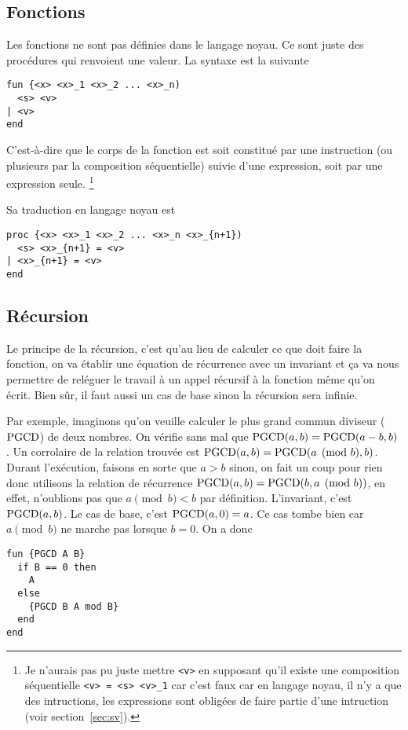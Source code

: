 \subsection{Fonctions}
Les fonctions ne sont pas définies dans le langage noyau.
Ce sont juste des procédures qui renvoient une valeur.
La syntaxe est la suivante
\begin{lstlisting}
fun {<x> <x>_1 <x>_2 ... <x>_n)
  <s> <v>
| <v>
end
\end{lstlisting}
C'est-à-dire que le corps de la fonction est soit constitué par une
instruction (ou plusieurs par la composition séquentielle)
suivie d'une expression, soit par une expression seule.
\footnote{Je n'aurais pas pu juste mettre \lstinline|<v>| en supposant
qu'il existe une composition
séquentielle \lstinline|<v> = <s> <v>_1| car c'est faux car en langage
noyau, il n'y a que des intructions, les expressions sont obligées de faire
partie d'une intruction (voir section~\ref{sec:sv}).}

Sa traduction en langage noyau est
\begin{lstlisting}
proc {<x> <x>_1 <x>_2 ... <x>_n <x>_{n+1})
  <s> <x>_{n+1} = <v>
| <x>_{n+1} = <v>
end
\end{lstlisting}

\subsection{Récursion}
\label{sec:rec}
Le principe de la récursion,
c'est qu'au lieu de calculer ce que doit faire la fonction,
on va établir une équation de récurrence avec un invariant et ça
va nous permettre de reléguer le travail à un appel récursif à la fonction
même qu'on écrit.
Bien sûr, il faut aussi un cas de base sinon la récursion sera
infinie.

Par exemple, imaginons qu'on veuille calculer le plus grand commun
diviseur ($\operatorname{PGCD}$) de deux nombres.
On vérifie sans mal que $\operatorname{PGCD}(a, b) = \operatorname{PGCD}(a-b, b)$.
Un corrolaire de la relation trouvée est
$\operatorname{PGCD}(a, b) = \operatorname{PGCD}(a \pmod{b}, b)$.
Durant l'exécution, faisons en sorte que $a > b$
sinon, on fait un coup pour rien donc utilisons
la relation de récurrence
$\operatorname{PGCD}(a, b) = \operatorname{PGCD}(b, a \pmod{b})$, en effet, n'oublions pas que
$a \pmod{b} < b$ par définition.
L'invariant, c'est $\operatorname{PGCD}(a,b)$.
Le cas de base, c'est $\operatorname{PGCD}(a, 0) = a$.
Ce cas tombe bien car $a \pmod{b}$ ne marche pas lorsque $b = 0$.
On a donc
\begin{lstlisting}
fun {PGCD A B}
  if B == 0 then
    A
  else
    {PGCD B A mod B}
  end
end
\end{lstlisting}

